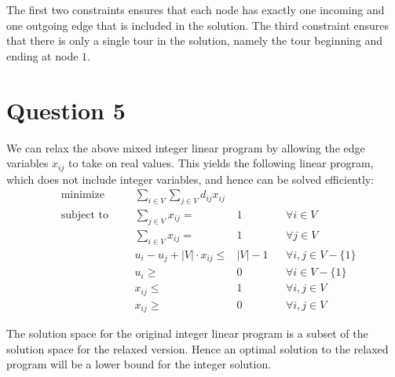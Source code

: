 \documentclass[a4paper, 10pt, oneside, article]{memoir}
\begin{document}
The first two constraints ensures that each node has exactly one
incoming and one outgoing edge that is included in the solution. The
third constraint ensures that there is only a single tour in the
solution, namely the tour beginning and ending at node $1$.


\section*{Question 5}

We can relax the above mixed integer linear program by allowing the
edge variables $x_{ij}$ to take on real values. This yields the
following linear program, which does not include integer variables,
and hence can be solved efficiently:
\begin{align*}
  &\text{minimize} &&& \sum_{i\in V} \sum_{j \in V} d_{ij} x_{ij} \\
  &\text{subject to} &&& \sum_{j \in V} x_{ij} ={}& 1 && \forall i \in V \\
  &                  &&& \sum_{i \in V} x_{ij} ={}& 1 && \forall j \in V \\
  &                  &&& u_i - u_j + |V| \cdot x_{ij} \leq{}& |V| - 1 && \forall i,j \in V - \{1\}  \\
  &                  &&& u_i \geq{}& 0 && \forall i \in V - \{1\} \\
  &                  &&& x_{ij} \leq{}& 1 && \forall i,j \in V \\
  &                  &&& x_{ij} \geq{}& 0 && \forall i,j \in V
\end{align*}

The solution space for the original integer linear program is a subset
of the solution space for the relaxed version. Hence an optimal
solution to the relaxed program will be a lower bound for the integer
solution.



\end{document}
